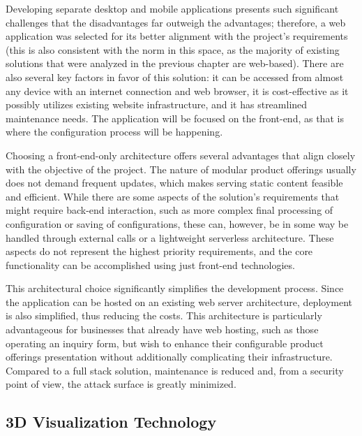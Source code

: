 Developing separate desktop and mobile applications presents such significant challenges that the disadvantages far outweigh the advantages; therefore, a web application was selected for its better alignment with the project's requirements (this is also consistent with the norm in this space, as the majority of existing solutions that were analyzed in the previous chapter are web-based). There are also several key factors in favor of this solution: it can be accessed from almost any device with an internet connection and web browser, it is cost-effective as it possibly utilizes existing website infrastructure, and it has streamlined maintenance needs. The application will be focused on the front-end, as that is where the configuration process will be happening.

Choosing a front-end-only architecture offers several advantages that align closely with the objective of the project. The nature of modular product offerings usually does not demand frequent updates, which makes serving static content feasible and efficient. While there are some aspects of the solution's requirements that might require back-end interaction, such as more complex final processing of configuration or saving of configurations, these can, however, be in some way be handled through external  calls or a lightweight serverless architecture. These aspects do not represent the highest priority requirements, and the core functionality can be accomplished using just front-end technologies.

This architectural choice significantly simplifies the development process. Since the application can be hosted on an existing web server architecture, deployment is also simplified, thus reducing the costs. This architecture is particularly advantageous for businesses that already have web hosting, such as those operating an inquiry form, but wish to enhance their configurable product offerings presentation without additionally complicating their infrastructure. Compared to a full stack solution, maintenance is reduced and, from a security point of view, the attack surface is greatly minimized.



\subsection{3D Visualization Technology} \label{section:3Dvistech}


